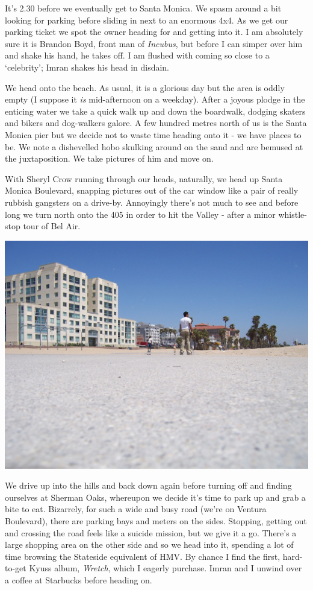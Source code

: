 \documentclass[a5paper,titlepage,11pt]{book}
\begin{document}
It's 2.30 before we eventually get to Santa Monica.  We spasm around a bit looking for parking before sliding in next to an enormous 4x4.  As we get our parking ticket we spot the owner heading for and getting into it.  I am absolutely sure it is Brandon Boyd, front man of \emph{Incubus}, but before I can simper over him and shake his hand, he takes off.  I am flushed with coming so close to a `celebrity'; Imran shakes his head in disdain.

We head onto the beach.  As usual, it is a glorious day but the area is oddly empty (I suppose it \emph{is} mid-afternoon on a weekday).  After a joyous plodge in the enticing water we take a quick walk up and down the boardwalk, dodging skaters and bikers and dog-walkers galore.  A few hundred metres north of us is the Santa Monica pier but we decide not to waste time heading onto it - we have places to be.  We note a dishevelled hobo skulking around on the sand and are bemused at the juxtaposition.  We take pictures of him and move on.

With Sheryl Crow running through our heads, naturally, we head up Santa Monica Boulevard, snapping pictures out of the car window like a pair of really rubbish gangsters on a drive-by.  Annoyingly there's not much to see and before long we turn north onto the 405 in order to hit the Valley - after a minor whistle-stop tour of Bel Air.

\begin{center}\includegraphics[width=\textwidth]{gfx/100_1735}\end{center}

We drive up into the hills and back down again before turning off and finding ourselves at Sherman Oaks, whereupon we decide it's time to park up and grab a bite to eat.  Bizarrely, for such a wide and busy road (we're on Ventura Boulevard), there are parking bays and meters on the sides.  Stopping, getting out and crossing the road feels like a suicide mission, but we give it a go.  There's a large shopping area on the other side and so we head into it, spending a lot of time browsing the Stateside equivalent of HMV.  By chance I find the first, hard-to-get Kyuss album, \emph{Wretch}, which I eagerly purchase.  Imran and I unwind over a coffee at Starbucks before heading on.
\end{document}
